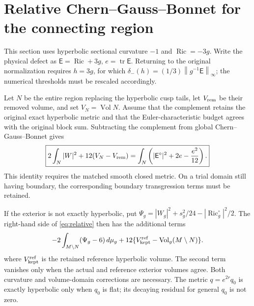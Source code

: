 \documentclass[a4paper,11pt]{article}
\numberwithin{equation}{section}
\theoremstyle{definition}
\newcommand{\Ric}{\operatorname{Ric}}
\newcommand{\Vol}{\operatorname{Vol}}
\newcommand{\tr}{\operatorname{tr}}
\newcommand{\dd}{\,d\mu_g}
\newcommand{\norm}[1]{\left\lVert#1\right\rVert}
\begin{document}
\section{Relative Chern--Gauss--Bonnet for the connecting region}\label{sec:relative-cgb}
This section uses hyperbolic sectional curvature $-1$ and $\Ric=-3g$. Write the physical defect as $\mathsf E=\Ric+3g$, $e=\tr\mathsf E$. Returning to the original normalization requires $h=3g$, for which $\delta_-(h)=(1/3)\norm{g^{-1}\mathsf E}_\infty$; the numerical thresholds must be rescaled accordingly.

Let $N$ be the entire region replacing the hyperbolic cusp tails, let $V_{\rm rem}$ be their removed volume, and set $V_N=\Vol N$. Assume that the complement retains the original exact hyperbolic metric and that the Euler-characteristic budget agrees with the original block sum. Subtracting the complement from global Chern--Gauss--Bonnet gives
\begin{equation}\label{eq:relative}
\boxed{
2\int_N|W|^2+12(V_N-V_{\rm rem})
=\int_N\left(|\mathsf E^\circ|^2+2e-\frac{e^2}{12}\right).}
\end{equation}
This identity requires the matched smooth closed metric. On a trial domain still having boundary, the corresponding boundary transgression terms must be retained.

If the exterior is not exactly hyperbolic, put
$\Psi_g=|W_g|^2+s_g^2/24-|\Ric_g^\circ|^2/2$.
The right-hand side of \eqref{eq:relative} then has the additional terms
\[
 -2\int_{M\setminus N}(\Psi_g-6)\dd
 +12\{V_{\rm kept}^{\rm ref}-\Vol_g(M\setminus N)\}.
\]
where $V_{\rm kept}^{\rm ref}$ is the retained reference hyperbolic volume. The second term vanishes only when the actual and reference exterior volumes agree.
Both curvature and volume-domain corrections are necessary.
The metric $q=e^{2r}q_0$ is exactly hyperbolic only when $q_0$ is flat; its decaying residual for general $q_0$ is not zero.
\end{document}
